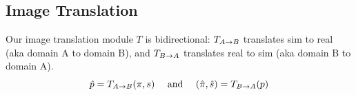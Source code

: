\documentclass{article}
\begin{document}



\vspace{-3pt}
	\subsection{Image Translation}
	\label{sec:image_translation}
\vspace{-3pt}









		Our image translation module $T$ is bidirectional: $T_{A\rightarrow B}$ translates sim to real (aka domain A to domain B), and $T_{B\rightarrow A}$ translates real to sim (aka domain B to domain A).
		\begin{equation}
			\hat{p}=T_{A\rightarrow B}(\pi,s)  \ \ \ \text{ and }\ \ \   (\hat{\pi},\hat{s})=T_{B\rightarrow A}(p)
		\end{equation}
			
\end{document}
